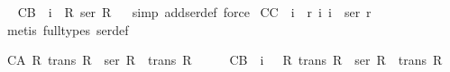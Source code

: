\begin{isabellebody}
%
\isadelimproof
\ %
\endisadelimproof
%
\isatagproof
{}\isamarkupfalse%
%
\endisatagproof
{\isafoldproof}%
%
\isadelimproof
%
\endisadelimproof
\isanewline
{}\isamarkupfalse%
\ C{}{\isacharunderscore}B{\isacharcolon}\ {\isachardoublequoteopen}{\isacharhash}\ i{}\ {\isasymlongrightarrow}\ {\isasymnot}{\isacharparenleft}{\isasymforall}R{\isachardot}\ {\isacharparenleft}ser\ R{\isacharparenright}{\isacharparenright}{\isachardoublequoteclose}%
\isadelimproof
\ %
\endisadelimproof
%
\isatagproof
{}\isamarkupfalse%
\ {\isacharparenleft}simp\ add{\isacharcolon}ser{\isacharunderscore}def{\isacharcomma}\ force{\isacharparenright}%
\endisatagproof
{\isafoldproof}%
%
\isadelimproof
%
\endisadelimproof
\isanewline
{}\isamarkupfalse%
\ C{}{\isacharunderscore}C{\isacharcolon}\ {\isachardoublequoteopen}{\isacharhash}\ i{}\ {\isasymand}\ {\isasymnot}r\ i{}\ i{}\ {\isasymlongrightarrow}\ {\isasymnot}{\isacharparenleft}ser\ r{\isacharparenright}{\isachardoublequoteclose}%
\isadelimproof
\ %
\endisadelimproof
%
\isatagproof
{}\isamarkupfalse%
\ {\isacharparenleft}metis\ {\isacharparenleft}full{\isacharunderscore}types{\isacharparenright}\ ser{\isacharunderscore}def{\isacharparenright}%
\endisatagproof
{\isafoldproof}%
%
\isadelimproof
%
\endisadelimproof
%
\begin{isamarkuptext}%
\begin{isbfig}{7em}
\end{isbfig}%
\end{isamarkuptext}%
\isamarkuptrue%
%
\isamarkuptrue%
\isamarkupfalse%
\ C{}{\isacharunderscore}A{\isacharcolon}\ {\isachardoublequoteopen}{\isasymforall}R{\isachardot}\ trans\ R\ {\isasymlongrightarrow}\ {\isacharparenleft}ser\ R\ {\isasymand}\ trans\ R{\isacharparenright}{\isachardoublequoteclose}\ \isanewline
\ \isamarkupfalse%
%
\isadelimproof
\ %
\endisadelimproof
%
\isatagproof
{}\isamarkupfalse%
%
\endisatagproof
{\isafoldproof}%
%
\isadelimproof
%
\endisadelimproof
\isanewline
{}\isamarkupfalse%
\ C{}{\isacharunderscore}B{\isacharcolon}\ {\isachardoublequoteopen}{\isacharhash}\ i{}\ {\isasymlongrightarrow}\ {\isasymnot}\ {\isacharparenleft}{\isasymforall}R{\isachardot}\ trans\ R\ {\isasymlongrightarrow}\ {\isacharparenleft}ser\ R\ {\isasymand}\ trans\ R{\isacharparenright}{\isacharparenright}{\isachardoublequoteclose}\ \isanewline

\end{isabellebody}
